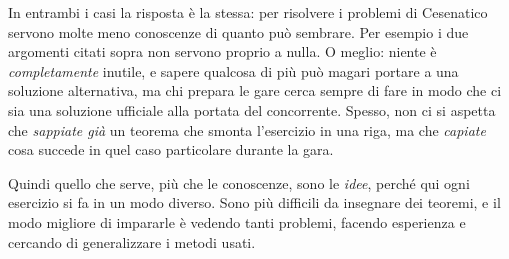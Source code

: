 \documentclass[a4paper,10pt]{paper}
\begin{document}
 In entrambi i casi la risposta è la stessa: per risolvere i problemi di Cesenatico servono molte meno conoscenze di quanto può sembrare. Per esempio i due argomenti citati sopra non servono proprio a nulla. O meglio: niente è \emph{completamente} inutile, e sapere qualcosa di più può magari portare a una soluzione alternativa, ma chi prepara le gare cerca sempre di fare in modo che ci sia una soluzione ufficiale alla portata del concorrente. Spesso, non ci si aspetta che \emph{sappiate già} un teorema che smonta l'esercizio in una riga, ma che \emph{capiate} cosa succede in quel caso particolare durante la gara.
 
 Quindi quello che serve, più che le conoscenze, sono le \emph{idee}, perché qui ogni esercizio si fa in un modo diverso. Sono più difficili da insegnare dei teoremi, e il modo migliore di impararle è vedendo tanti problemi, facendo esperienza e cercando di generalizzare i metodi usati. 
 
\end{document}
